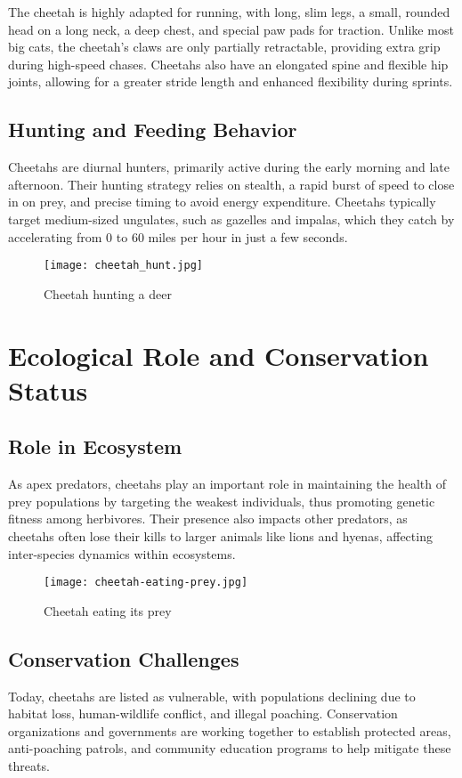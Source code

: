 \documentclass{article}
\begin{document}
The cheetah is highly adapted for running, with long, slim legs, a small, rounded head on a long neck, a deep chest, and special paw pads for traction. Unlike most big cats, the cheetah’s claws are only partially retractable, providing extra grip during high-speed chases. Cheetahs also have an elongated spine and flexible hip joints, allowing for a greater stride length and enhanced flexibility during sprints.

\subsection{Hunting and Feeding Behavior}
Cheetahs are diurnal hunters, primarily active during the early morning and late afternoon. Their hunting strategy relies on stealth, a rapid burst of speed to close in on prey, and precise timing to avoid energy expenditure. Cheetahs typically target medium-sized ungulates, such as gazelles and impalas, which they catch by accelerating from 0 to 60 miles per hour in just a few seconds.

\begin{figure}[H]
    \centering
    \texttt{[image: cheetah\_hunt.jpg]}
    \caption{Cheetah hunting a deer}
\end{figure}

\section{Ecological Role and Conservation Status}

\subsection{Role in Ecosystem}
As apex predators, cheetahs play an important role in maintaining the health of prey populations by targeting the weakest individuals, thus promoting genetic fitness among herbivores. Their presence also impacts other predators, as cheetahs often lose their kills to larger animals like lions and hyenas, affecting inter-species dynamics within ecosystems.

\begin{figure}[H]
    \centering
    \texttt{[image: cheetah-eating-prey.jpg]}
    \caption{Cheetah eating its prey}
\end{figure}

\subsection{Conservation Challenges}
Today, cheetahs are listed as vulnerable, with populations declining due to habitat loss, human-wildlife conflict, and illegal poaching. Conservation organizations and governments are working together to establish protected areas, anti-poaching patrols, and community education programs to help mitigate these threats.
\end{document}
